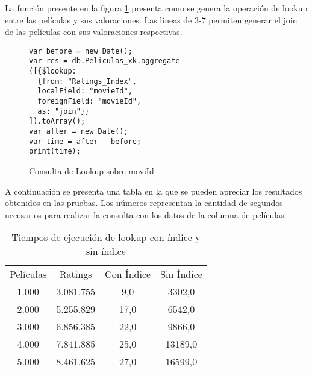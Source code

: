 \documentclass[conference,compsoc]{sty/IEEEtran}
\begin{document}
La  función presente en la figura \ref{fig:consulta-lookupIndices} presenta como se  genera la operación de lookup entre  las películas y sus valoraciones. Las líneas de 3-7 permiten generar el join de las películas con sus valoraciones respectivas.

\begin{figure}
    \begin{verbatim}
var before = new Date();
var res = db.Peliculas_xk.aggregate
([{$lookup:
  {from: "Ratings_Index",
  localField: "movieId",
  foreignField: "movieId",
  as: "join"}}
]).toArray();
var after = new Date();
var time = after - before;
print(time);
\end{verbatim}
\caption{Consulta de Lookup sobre moviId} 
\label{fig:consulta-lookupIndices}
\end{figure}

A continuación se presenta una tabla en la que se pueden apreciar los resultados obtenidos en las pruebas. Los números representan la cantidad de segundos necesarios para realizar la consulta con los datos de la columna de películas:

\begin{table}
\begin{center}
\begin{tabular}{ c c c c }
 Películas & Ratings & Con Índice & Sin Índice \\ 
 1.000 & 3.081.755 & 9,0 & 3302,0 \\  
 2.000 & 5.255.829 & 17,0 & 6542,0 \\
 3.000 & 6.856.385 & 22,0 & 9866,0 \\  
 4.000 & 7.841.885 & 25,0 & 13189,0 \\
 5.000 & 8.461.625 & 27,0 & 16599,0
\end{tabular}
\end{center}
\caption{Tiempos de ejecución de lookup con índice y sin índice}
\label{table:1}
\end{table}
\end{document}
